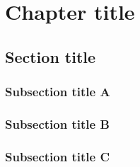 \documentclass[a4paper,oneside]{exampleclass}
\begin{document}
\chapter{Chapter title}

\kant[1]

\section{Section title}

\kant[2-7]

\subsection{Subsection title A}

\kant[8-10]

\subsection{Subsection title B}

\kant[11-14]

\subsection{Subsection title C}

\kant[15-18]
\end{document}
